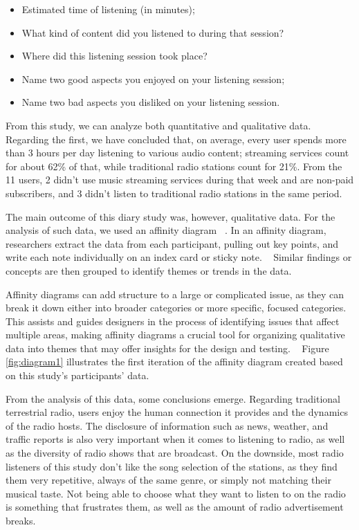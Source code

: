 \begin{itemize}
  \item Estimated time of listening (in minutes);
  \item What kind of content did you listened to during that session?
  \item Where did this listening session took place?
  \item Name two good aspects you enjoyed on your listening session;
  \item Name two bad aspects you disliked on your listening session.
\end{itemize}

From this study, we can analyze both quantitative and qualitative data. Regarding the first, we have concluded that, on average, every user spends more than 3 hours per day listening to various audio content; streaming services count for about 62\% of that, while traditional radio stations count for 21\%. From the 11 users, 2 didn't use music streaming services during that week and are non-paid subscribers, and 3 didn't listen to traditional radio stations in the same period. 

The main outcome of this diary study was, however, qualitative data. For the analysis of such data, we used an affinity diagram ~\cite{Wilson2012}. In an affinity diagram, researchers extract the data from each participant, pulling out key points, and write each note individually on an index card or sticky note. ~\cite{Courage2005} Similar findings or concepts are then grouped to identify themes or trends in the data. 

Affinity diagrams can add structure to a large or complicated issue, as they can break it down either into broader categories or more specific, focused categories. This assists and guides designers in the process of identifying issues that affect multiple areas, making affinity diagrams a crucial tool for organizing qualitative data into themes that may offer insights for the design and testing. ~\cite{Holtzblatt1988} Figure \ref{fig:diagram1} illustrates the first iteration of the affinity diagram created based on this study's participants' data.

From the analysis of this data, some conclusions emerge. Regarding traditional terrestrial radio, users enjoy the human connection it provides and the dynamics of the radio hosts. The disclosure of information such as news, weather, and traffic reports is also very important when it comes to listening to radio, as well as the diversity of radio shows that are broadcast. On the downside, most radio listeners of this study don't like the song selection of the stations, as they find them very repetitive, always of the same genre, or simply not matching their musical taste. Not being able to choose what they want to listen to on the radio is something that frustrates them, as well as the amount of radio advertisement breaks.

